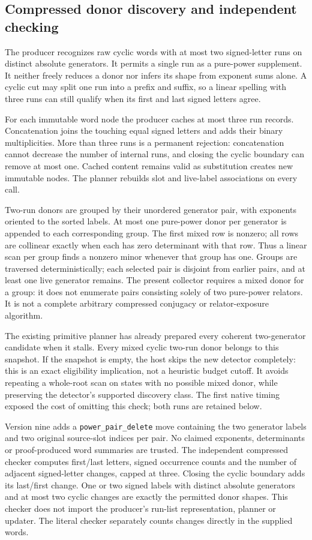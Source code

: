 \subsection{Compressed donor discovery and independent checking}

The producer recognizes raw cyclic words with at most two signed-letter runs
on distinct absolute generators. It permits a single run as a pure-power
supplement. It neither freely reduces a donor nor infers its shape from
exponent sums alone. A cyclic cut may split one run into a prefix and suffix,
so a linear spelling with three runs can still qualify when its first and
last signed letters agree.

For each immutable word node the producer caches at most three run records.
Concatenation joins the touching equal signed letters and adds their binary
multiplicities. More than three runs is a permanent rejection: concatenation
cannot decrease the number of internal runs, and closing the cyclic boundary
can remove at most one. Cached content remains valid as substitution creates
new immutable nodes. The planner rebuilds slot and live-label associations
on every call.

Two-run donors are grouped by their unordered generator pair, with exponents
oriented to the sorted labels. At most one pure-power donor per generator
is appended to each corresponding group. The first mixed row is nonzero;
all rows are collinear exactly when each has zero determinant with that row.
Thus a linear scan per group finds a nonzero minor whenever that group has
one. Groups are traversed deterministically; each selected pair is disjoint
from earlier pairs, and at least one live generator remains. The present
collector requires a mixed donor for a group: it does not enumerate pairs
consisting solely of two pure-power relators. It is not a complete arbitrary
compressed conjugacy or relator-exposure algorithm.

The existing primitive planner has already prepared every coherent two-generator
candidate when it stalls. Every mixed cyclic two-run donor belongs to this
snapshot. If the snapshot is empty, the host skips the new detector completely:
this is an exact eligibility implication, not a heuristic budget cutoff.
It avoids repeating a whole-root scan on states with no possible mixed donor,
while preserving the detector's supported discovery class. The first native
timing exposed the cost of omitting this check; both runs are retained below.

Version nine adds a \texttt{power\_pair\_delete} move containing the two
generator labels and two original source-slot indices per pair. No claimed
exponents, determinants or proof-produced word summaries are trusted. The
independent compressed checker computes first/last letters, signed occurrence
counts and the number of adjacent signed-letter changes, capped at three.
Closing the cyclic boundary adds its last/first change. One or two signed
labels with distinct absolute generators and at most two cyclic changes are
exactly the permitted donor shapes. This checker does not import the
producer's run-list representation, planner or updater. The literal checker
separately counts changes directly in the supplied words.

